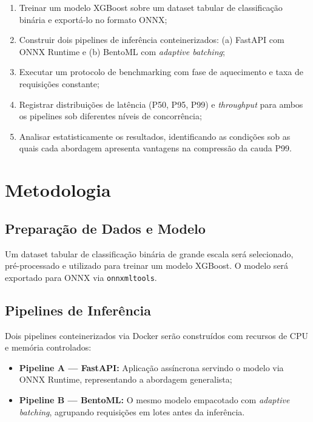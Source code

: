 \documentclass[12pt,a4paper]{article}
\renewcommand{\cite}{\supercite}
\begin{document}
\begin{enumerate}
  \item Treinar um modelo XGBoost sobre um dataset tabular de classificação binária e exportá-lo no formato ONNX;
  \item Construir dois pipelines de inferência conteinerizados: (a) FastAPI com ONNX Runtime e (b) BentoML com \textit{adaptive batching};
  \item Executar um protocolo de benchmarking com fase de aquecimento e taxa de requisições constante;
  \item Registrar distribuições de latência (P50, P95, P99) e \textit{throughput} para ambos os pipelines sob diferentes níveis de concorrência;
  \item Analisar estatisticamente os resultados, identificando as condições sob as quais cada abordagem apresenta vantagens na compressão da cauda P99.
\end{enumerate}

\newpage
\section{Metodologia}

\subsection{Preparação de Dados e Modelo}

Um dataset tabular de classificação binária de grande escala será selecionado, pré-processado e utilizado para treinar um modelo XGBoost. O modelo será exportado para ONNX via \texttt{onnxmltools}.\cite{onnxruntime2024}

\subsection{Pipelines de Inferência}

Dois pipelines conteinerizados via Docker serão construídos com recursos de CPU e memória controlados:

\begin{itemize}
  \item \textbf{Pipeline A --- FastAPI:} Aplicação assíncrona servindo o modelo via ONNX Runtime, representando a abordagem generalista;
  \item \textbf{Pipeline B --- BentoML:} O mesmo modelo empacotado com \textit{adaptive batching}, agrupando requisições em lotes antes da inferência.
\end{itemize}
\end{document}

